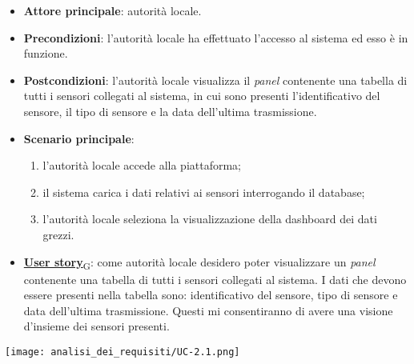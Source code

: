 \begin{itemize}
	\item \textbf{Attore principale}: autorità locale.
	\item \textbf{Precondizioni}: l'autorità locale ha effettuato l'accesso al sistema ed esso è in funzione.
	\item \textbf{Postcondizioni}: l'autorità locale visualizza il \textit{panel} contenente una tabella di tutti i sensori collegati al sistema,
	      in cui sono presenti l'identificativo del sensore, il tipo di sensore e la data dell'ultima trasmissione.
	\item \textbf{Scenario principale}:
	      \begin{enumerate}
		      \item l'autorità locale accede alla piattaforma;
		      \item il sistema carica i dati relativi ai sensori interrogando il database;
		      \item l'autorità locale seleziona la visualizzazione della dashboard dei dati grezzi.
	      \end{enumerate}
	\item \href{https://7last.github.io/docs/rtb/documentazione-interna/glossario\#user-story}{\textbf{User story}\textsubscript{G}}: come autorità locale desidero poter visualizzare un \textit{panel} contenente una tabella di tutti i sensori collegati al sistema. I dati che devono essere presenti nella tabella sono: identificativo del sensore, tipo di sensore e data dell'ultima trasmissione. Questi mi consentiranno di avere una visione d'insieme dei sensori presenti.
\end{itemize}
\begin{center}
	\texttt{[image: analisi\_dei\_requisiti/UC-2.1.png]}
\end{center}

